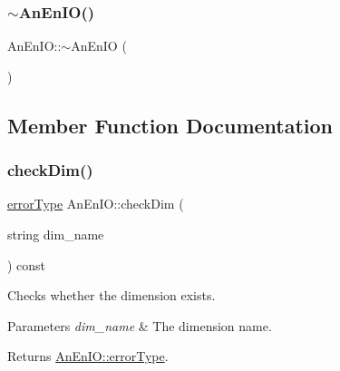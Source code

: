 \mbox{\label{class_an_en_i_o_a1e7aef95fd2a0c6aaef55998f48368f4}} 
\subsubsection{\texorpdfstring{$\sim$\+An\+En\+I\+O()}{~AnEnIO()}}
{\footnotesize\ttfamily An\+En\+I\+O\+::$\sim$\+An\+En\+IO (\begin{DoxyParamCaption}{ }\end{DoxyParamCaption})\hspace{0.3cm}{\ttfamily [virtual]}}



\subsection{Member Function Documentation}
\mbox{\label{class_an_en_i_o_ab99f9aebd7b145de00fe15b8d4869ac2}} 
\subsubsection{\texorpdfstring{check\+Dim()}{checkDim()}}
{\footnotesize\ttfamily \mbox{\hyperlink{class_an_en_i_o_aa56bc1ec6610b86db4349bce20f9ead0}{error\+Type}} An\+En\+I\+O\+::check\+Dim (\begin{DoxyParamCaption}\item[{string}]{dim\+\_\+name }\end{DoxyParamCaption}) const}

Checks whether the dimension exists.


\begin{DoxyParams}{Parameters}
{\em dim\+\_\+name} & The dimension name. \\
\hline
\end{DoxyParams}
\begin{DoxyReturn}{Returns}
\mbox{\hyperlink{class_an_en_i_o_aa56bc1ec6610b86db4349bce20f9ead0}{An\+En\+I\+O\+::error\+Type}}. 
\end{DoxyReturn}
\mbox{\label{class_an_en_i_o_ab6cd06f6402655924002fec4f83195eb}} 
